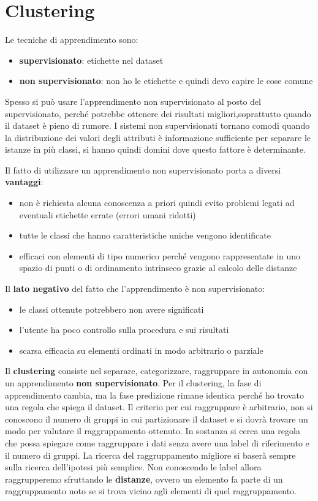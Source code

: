 \chapter{Clustering}
Le tecniche di apprendimento sono:
\begin{itemize}
	\item \textbf{supervisionato}: etichette nel dataset
	\item \textbf{non supervisionato}: non ho le etichette e quindi devo capire
    le cose comune 
\end{itemize}
Spesso si può usare l'apprendimento non supervisionato al posto del supervisionato,
perché potrebbe ottenere dei risultati migliori,soprattutto quando il dataset è
pieno di rumore.  I sistemi non supervisionati tornano comodi quando la distribuzione dei
valori degli attributi è informazione sufficiente per separare le istanze in più
classi, si hanno quindi domini dove questo fattore è determinante. 

Il fatto di utilizzare un apprendimento non supervisionato porta a diversi \textbf{vantaggi}:
\begin{itemize}
    \item non è richiesta alcuna conoscenza a priori quindi evito problemi legati 
    ad eventuali etichette errate (errori umani ridotti)
    \item tutte le classi che hanno caratteristiche uniche vengono identificate
    \item efficaci con elementi di tipo numerico perché vengono rappresentate in
    uno spazio di punti o di ordinamento intrinseco grazie al calcolo delle distanze
\end{itemize}

Il \textbf{lato negativo} del fatto che l'apprendimento è non supervisionato:
\begin{itemize}
    \item le classi ottenute potrebbero non avere significati
    \item l'utente ha poco controllo sulla procedura e sui risultati
    \item scarsa efficacia su elementi ordinati in modo arbitrario o parziale
\end{itemize}

Il \textbf{clustering} consiste nel  separare, categorizzare, raggruppare in 
autonomia con un apprendimento \textbf{non supervisionato}. 
Per il clustering, la fase di apprendimento cambia, ma la fase predizione rimane 
identica perché ho trovato una regola che spiega il dataset. Il criterio per cui
raggruppare è arbitrario, non si conoscono il numero di gruppi in cui partizionare il dataset
e si dovrà trovare un modo per valutare il raggruppamento ottenuto. 
In sostanza si cerca una regola che possa spiegare come raggruppare i 
dati senza avere una label di riferimento e il numero di gruppi. La ricerca del raggruppamento migliore
si baserà sempre sulla ricerca dell'ipotesi più semplice. Non conoscendo le 
label allora raggrupperemo sfruttando le \textbf{distanze}, ovvero un elemento 
fa parte di un raggruppamento noto se si trova vicino agli elementi di quel 
raggruppamento.

